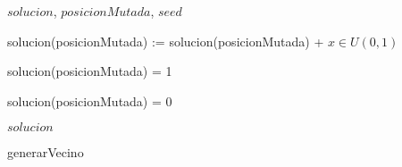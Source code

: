 \documentclass{article}
\begin{document}
\begin{algorithm}
\begin{algorithmic}[1]
    \REQUIRE $solucion$, $posicionMutada$, $seed$



    \STATE solucion(posicionMutada) := 	solucion(posicionMutada) + $x \in U(0,1)$

	\STATE solucion(posicionMutada) = 1 
    \ENDIF

	\STATE solucion(posicionMutada) = 0 
    \ENDIF

    \RETURN $solucion$
\end{algorithmic}
\caption{generarVecino}
\end{algorithm}
\end{document}
